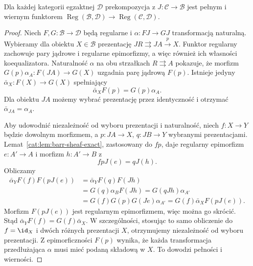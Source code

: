 \begin{stwierdzenie}\label{cat:prop:barr-completion-full-faithful}
Dla każdej kategorii egzaktnej $\mathcal D$ prekompozycja z $J:\mathcal C\to\mathcal B$ jest pełnym i wiernym funktorem $\operatorname{Reg}(\mathcal B,\mathcal D)\to\operatorname{Reg}(\mathcal C,\mathcal D)$.
\end{stwierdzenie}
\begin{proof}
Niech $F,G:\mathcal B\to\mathcal D$ będą regularne i $\alpha:FJ\to GJ$ transformacją naturalną. Wybieramy dla obiektu $X\in\mathcal B$ prezentację $JR\rightrightarrows JA\xrightarrow{p}X$. Funktor regularny zachowuje pary jądrowe i regularne epimorfizmy, a więc również ich własności koequalizatora. Naturalność $\alpha$ na obu strzałkach $R\rightrightarrows A$ pokazuje, że morfizm $G(p)\alpha_A:F(JA)\to G(X)$ uzgadnia parę jądrową $F(p)$. Istnieje jedyny $\bar\alpha_X:F(X)\to G(X)$ spełniający
\[
 \bar\alpha_X F(p)=G(p)\alpha_A .
\]
Dla obiektu $JA$ możemy wybrać prezentację przez identyczność i otrzymać $\bar\alpha_{JA}=\alpha_A$.

Aby udowodnić niezależność od wyboru prezentacji i naturalność, niech $f:X\to Y$ będzie dowolnym morfizmem, a $p:JA\to X$, $q:JB\to Y$ wybranymi prezentacjami. Lemat~\ref{cat:lem:barr-sheaf-exact}, zastosowany do $fp$, daje regularny epimorfizm $e:A'\to A$ i morfizm $h:A'\to B$ z
\[
 fpJ(e)=qJ(h).
\]
Obliczamy
\[
\begin{aligned}
 \bar\alpha_Y F(f)F(pJ(e))
 &=\bar\alpha_Y F(q)F(Jh)\\
 &=G(q)\alpha_B F(Jh)
 =G(qJh)\alpha_{A'}\\
 &=G(f)G(p)G(Je)\alpha_{A'}
 =G(f)\bar\alpha_X F(pJ(e)).
\end{aligned}
\]
Morfizm $F(pJ(e))$ jest regularnym epimorfizmem, więc można go skrócić. Stąd $\bar\alpha_YF(f)=G(f)\bar\alpha_X$. W szczególności, stosując to samo obliczenie do $f=\id_X$ i dwóch różnych prezentacji $X$, otrzymujemy niezależność od wyboru prezentacji. Z epimorficzności $F(p)$ wynika, że każda transformacja przedłużająca $\alpha$ musi mieć podaną składową w $X$. To dowodzi pełności i wierności.
\end{proof}

